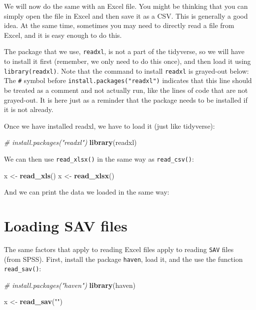 \documentclass[]{book}
\newenvironment{Shaded}{\begin{snugshade}}{\end{snugshade}}
\newcommand{\KeywordTok}[1]{\textcolor[rgb]{0.13,0.29,0.53}{\textbf{#1}}}
\newcommand{\StringTok}[1]{\textcolor[rgb]{0.31,0.60,0.02}{#1}}
\newcommand{\CommentTok}[1]{\textcolor[rgb]{0.56,0.35,0.01}{\textit{#1}}}
\newcommand{\NormalTok}[1]{#1}
\theoremstyle{definition}
\theoremstyle{definition}
\theoremstyle{remark}
\begin{document}
We will now do the same with an Excel file. You might be thinking that
you can simply open the file in Excel and then save it as a CSV. This is
generally a good idea. At the same time, sometimes you may need to
directly read a file from Excel, and it is easy enough to do this.

The package that we use, \texttt{readxl}, is not a part of the
tidyverse, so we will have to install it first (remember, we only need
to do this once), and then load it using \texttt{library(readxl)}. Note
that the command to install \texttt{readxl} is grayed-out below: The
\texttt{\#} symbol before \texttt{install.packages("readxl")} indicates
that this line should be treated as a comment and not actually run, like
the lines of code that are not grayed-out. It is here just as a reminder
that the package needs to be installed if it is not already.

Once we have installed readxl, we have to load it (just like tidyverse):

\begin{Shaded}
\begin{Highlighting}[]
\CommentTok{# install.packages("readxl")}
\KeywordTok{library}\NormalTok{(readxl)}
\end{Highlighting}
\end{Shaded}

We can then use \texttt{read\_xlsx()} in the same way as
\texttt{read\_csv()}:

\begin{Shaded}
\begin{Highlighting}[]
\NormalTok{x <-}\StringTok{ }\KeywordTok{read_xls}\NormalTok{()}
\NormalTok{x <-}\StringTok{ }\KeywordTok{read_xlsx}\NormalTok{()}
\end{Highlighting}
\end{Shaded}

And we can print the data we loaded in the same way:

\section{Loading SAV files}\label{loading-sav-files}

The same factors that apply to reading Excel files apply to reading
\texttt{SAV} files (from SPSS). First, install the package
\texttt{haven}, load it, and the use the function \texttt{read\_sav()}:

\begin{Shaded}
\begin{Highlighting}[]
\CommentTok{# install.packages("haven")}
\KeywordTok{library}\NormalTok{(haven)}

\NormalTok{x <-}\StringTok{ }\KeywordTok{read_sav}\NormalTok{(}\StringTok{""}\NormalTok{)}
\end{Highlighting}
\end{Shaded}
\end{document}
